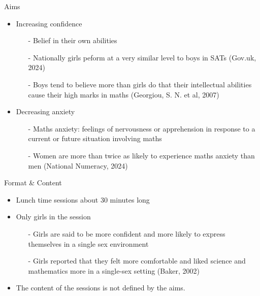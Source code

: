 \documentclass{beamer}  %
\begin{document}
\begin{frame}{Aims}
    \begin{itemize}
        \item Increasing confidence
        \begin{itemize}
            \item[-] Belief in their own abilities
            \item[-]Nationally girls peform at a very similar level to boys in SATs (Gov.uk, 2024)
            \item[-] Boys tend to believe more than girls do that their intellectual abilities cause their high marks in maths (Georgiou, S. N. et al, 2007)
        \end{itemize}
        \item Decreasing anxiety
        \begin{itemize}
            \item[-] Maths anxiety: feelings of nervousness or apprehension in response to a current or future  situation involving maths 
            \item[-]Women are more than twice as likely to experience maths anxiety than men (National Numeracy, 2024) 
        \end{itemize}
    \end{itemize}
\end{frame}


\begin{frame}{Format \& Content}
    \begin{itemize}
        \item Lunch time sessions about 30 minutes long
        \item Only girls in the session
        \begin{itemize}
            \item[-] Girls are said to be more confident and more likely to express themselves in a single sex environment
            \item[-] Girls reported that they felt more comfortable and liked science and mathematics more
            in a single-sex setting (Baker, 2002)
        \end{itemize}
        \item The content of the sessions is not defined by the aims.
    \end{itemize}
\end{frame}


\end{document}
